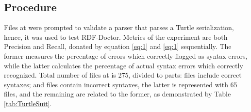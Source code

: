 \subsection{Procedure}
Files at \cite{TurtleTests:Online} were prompted to validate a parser that parses a Turtle serialization, hence, it was used to test RDF-Doctor. Metrics of the experiment are both Precision and Recall, donated by equation \ref{eq:1} and \ref{eq:1} sequentially. The former measures the percentage of errors which correctly flagged as syntax errors, while the latter calculates the percentage of actual syntax errors which correctly recognized. Total number of files at \cite{TurtleTests:Online} is 275, divided to parts: files include  correct syntaxes; and files contain incorrect syntaxes, the latter is represented with 65 files, and the remaining are related to the former, as demonstrated by Table \ref{tab:TurtleSuit}. 
 
